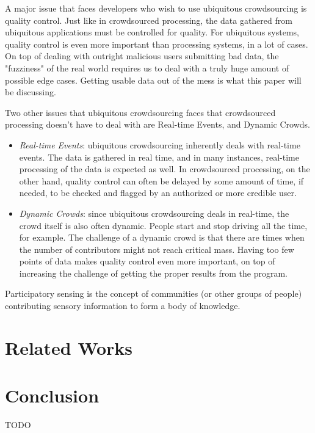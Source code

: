 \documentclass[12pt,twocolumn]{article}
\begin{document}
	    A major issue that faces developers who wish to use ubiquitous crowdsourcing is quality control. Just like in crowdsourced processing, the data gathered from ubiquitous applications must be controlled for quality. For ubiquitous systems, quality control is even more important than processing systems, in a lot of cases. On top of dealing with outright malicious users submitting bad data, the "fuzziness" of the real world requires us to deal with a truly huge amount of possible edge cases. Getting usable data out of the mess is what this paper will be discussing.
	    
	    Two other issues that ubiquitous crowdsourcing faces that crowdsourced processing doesn't have to deal with are Real-time Events, and Dynamic Crowds.
	    \begin{itemize}
	        \item \emph{Real-time Events}: ubiquitous crowdsourcing inherently deals with real-time events. The data is gathered in real time, and in many instances, real-time processing of the data is expected as well. %
	        In crowdsourced processing, on the other hand, quality control can often be delayed by some amount of time, if needed, to be checked and flagged by an authorized or more credible user. 
	        
	        
	        \item \emph{Dynamic Crowds}: since ubiquitous crowdsourcing deals in real-time, the crowd itself is also often dynamic. People start and stop driving all the time, for example. The challenge of a dynamic crowd is that there are times when the number of contributors might not reach critical mass. Having too few points of data makes quality control even more important, on top of increasing the challenge of getting the proper results from the program.
	    \end{itemize}
	    
	    Participatory sensing is the concept of communities (or other groups of people) contributing sensory information to form a body of knowledge. %
	    
	    
	\section*{Related Works}
	    
	\section*{Conclusion}
	    TODO
	
	
\end{document}
